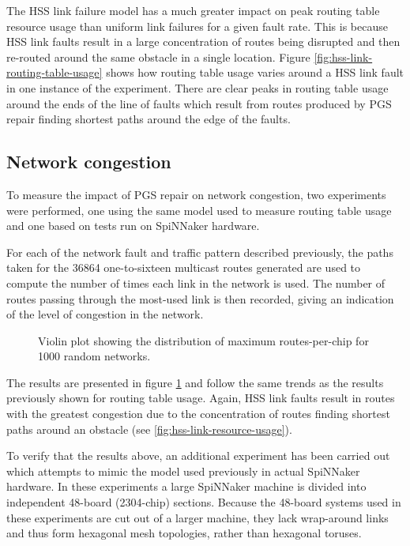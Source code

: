 			The HSS link failure model has a much greater impact on peak routing
			table resource usage than uniform link failures for a given fault rate.
			This is because HSS link faults result in a large concentration of routes
			being disrupted and then re-routed around the same obstacle in a single
			location. Figure \ref{fig:hss-link-routing-table-usage} shows how routing
			table usage varies around a HSS link fault in one instance of the
			experiment. There are clear peaks in routing table usage around the ends
			of the line of faults which result from routes produced by PGS repair
			finding shortest paths around the edge of the faults.
		
		\subsection{Network congestion}
			
			To measure the impact of PGS repair on network congestion, two
			experiments were performed, one using the same model used to measure
			routing table usage and one based on tests run on SpiNNaker hardware.
			
			For each of the network fault and traffic pattern described previously,
			the paths taken for the \num{36864} one-to-sixteen multicast routes
			generated are used to compute the number of times each link in the
			network is used. The number of routes passing through the most-used link
			is then recorded, giving an indication of the level of congestion in the
			network.
			
			\begin{figure}
				\center
				
				\caption{Violin plot showing the distribution of maximum
				routes-per-chip for \num{1000} random networks.}
				\label{fig:routing-resource}
			\end{figure}
			
			The results are presented in figure \ref{fig:routing-resource} and follow
			the same trends as the results previously shown for routing table usage.
			Again, HSS link faults result in routes with the greatest congestion due
			to the concentration of routes finding shortest paths around an obstacle
			(see \ref{fig:hss-link-resource-usage}).
			
			To verify that the results above, an additional experiment has been
			carried out which attempts to mimic the model used previously in actual
			SpiNNaker hardware. In these experiments a large SpiNNaker machine is
			divided into independent 48-board (2304-chip) sections. Because the
			48-board systems used in these experiments are cut out of a larger
			machine, they lack wrap-around links and thus form hexagonal mesh
			topologies, rather than hexagonal toruses.
			

